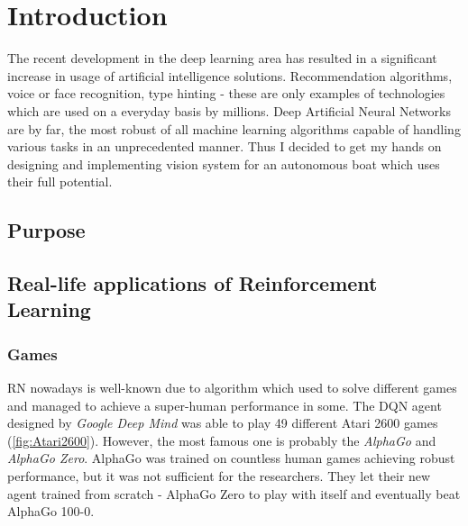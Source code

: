 \chapter{Introduction}
\label{cha:introduction}

The recent development in the deep learning area has resulted in a significant increase in usage of artificial intelligence solutions. Recommendation algorithms, voice or face recognition, type hinting - these are only examples of technologies which are used on a everyday basis by millions. Deep Artificial Neural Networks are by far, the most robust of all machine learning algorithms capable of handling various tasks in an unprecedented manner. Thus I decided to get my hands on designing and implementing vision system for an autonomous boat which uses their full potential.

\section{Purpose}
\label{sec:purpose}

\section{Real-life applications of Reinforcement Learning}
\label{sec:real-life-applications-of-deep-learning}

\subsection{Games}
\label{sub:intro-games}
RN nowadays is well-known due to algorithm which used to solve different games and managed to achieve a super-human performance in some.
The DQN agent designed by \emph{Google Deep Mind} was able to play 49 different Atari 2600 games (\ref{fig:Atari2600}). However, the most famous one is probably the \emph{AlphaGo} \cite{AlphaGO}  and \emph{AlphaGo Zero}. AlphaGo was trained on countless human games achieving robust performance, but it was not sufficient for the researchers. They let their new agent trained from scratch - AlphaGo Zero to play with itself and eventually beat AlphaGo 100-0. 

